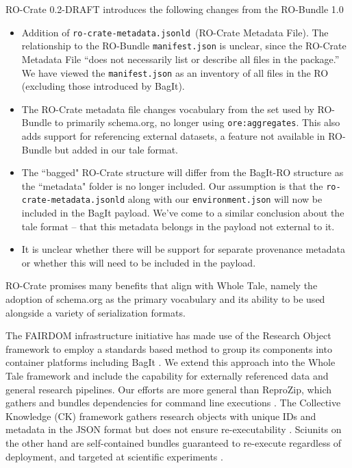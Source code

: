 \documentclass[conference]{IEEEtran}
\begin{document}
RO-Crate 0.2-DRAFT introduces the following changes from the RO-Bundle 1.0
\begin{itemize}
\item{Addition of \texttt{ro-crate-metadata.jsonld }(RO-Crate Metadata File). The relationship to the RO-Bundle \texttt{manifest.json} is unclear, since the RO-Crate Metadata File ``does not necessarily list or describe all files in the package.'' We have viewed the \texttt{manifest.json} as an inventory of all files in the RO (excluding those introduced by BagIt).}
\item{The RO-Crate metadata file changes vocabulary from the set used by RO-Bundle to primarily schema.org, no longer using \texttt{ore:aggregates}. This also adds support for referencing external datasets, a feature not available in RO-Bundle but added in our tale format.}
\item{The ``bagged" RO-Crate structure will differ from the BagIt-RO structure as the ``metadata" folder is no longer included.  Our assumption is that the \texttt{ro-crate-metadata.jsonld} along with our \texttt{environment.json} will now be included in the BagIt payload. We've come to a similar conclusion about the tale format -- that this metadata belongs in the payload not external to it.}
\item{It is unclear whether there will be support for separate provenance metadata or whether this will need to be included in the payload.}
\end{itemize}

RO-Crate promises many benefits that align with Whole Tale, namely the adoption of schema.org as the primary vocabulary and its ability to be used alongside a variety of serialization formats. 

The FAIRDOM infrastructure initiative has made use of the Research Object framework to employ a standards based method to group its components into container platforms including BagIt \cite{Stanford2016}. We extend this approach into the Whole Tale framework and include the capability for externally referenced data and general research pipelines. Our efforts are more general than ReproZip, which gathers and bundles dependencies for command line executions \cite{Chirigati2016}. The Collective Knowledge (CK) framework gathers research objects with unique IDs and metadata in the JSON format but does not ensure re-executability \cite{fursin2018}. Sciunits on the other hand are self-contained bundles guaranteed to re-execute regardless of deployment, and targeted at scientific experiments \cite{That2017, Yuan2018}.
\end{document}
